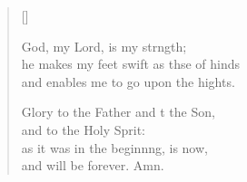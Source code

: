 \begin{verse}[\versewidth]
\begin{patverse}
God, my Lord, is my strngth;\Flex\\
he makes my feet swift as thse of hinds\Med\\
and enables me to go upon the hights.

Glory to the Father and t the Son,\Med\\
and to the Holy Sp\pointup{\i}rit:\\
as it was in the beginn\pointup{\i}ng, is now,\Med\\
and will be forever. Amn. 
  \end{patverse}
\end{verse}
